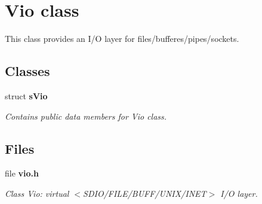 \section{Vio class}
\label{a00028}


This class provides an I/O layer for files/bufferes/pipes/sockets.  


\subsection*{Classes}
\begin{DoxyCompactItemize}
\item 
struct {\bf sVio}
\begin{DoxyCompactList}\small\item\em Contains public data members for Vio class. \item\end{DoxyCompactList}\end{DoxyCompactItemize}
\subsection*{Files}
\begin{DoxyCompactItemize}
\item 
file {\bf vio.h}


\begin{DoxyCompactList}\small\item\em Class Vio: virtual $<$SDIO/FILE/BUFF/UNIX/INET$>$ I/O layer. \item\end{DoxyCompactList}

\end{DoxyCompactItemize}
